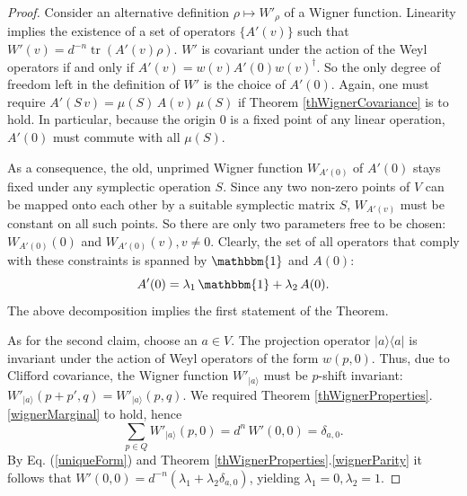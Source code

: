 \documentclass[aps,twocolumn,floatfix]{revtex4}
\def\ket#1.{|#1\rangle}
\def\bra#1.{\langle#1|}
\def\H{\mathcal{H}}
\def\Id{\mathbbm{1}}
\DeclareMathOperator{\tr}{tr}
\begin{document}
\begin{proof}
	Consider an alternative definition $\rho \mapsto W'_\rho$ of a
	Wigner function. Linearity implies the existence of a set of
	operators $\{A'(v)\}$ such that
	$
		W'(v)=d^{-n} \tr(A'(v) \rho)
	$.
	$W'$ is covariant under the action of the Weyl operators if and only
	if $A'(v)=w(v)A'(0)w(v)^\dagger$. So the only degree of freedom left
	in the definition of $W'$ is the choice of $A'(0)$. Again, one must
	require $A'(S\,v)=\mu(S)\,A(v)\,\mu(S)$ if Theorem
	\ref{thWignerCovariance} is to hold. In
	particular, because the origin $0$ is a fixed point of any linear
	operation, $A'(0)$ must commute with all $\mu(S)$.

	As a consequence, the old, unprimed Wigner function $W_{A'(0)}$ of
	$A'(0)$ stays fixed under any symplectic operation $S$.	Since any two
	non-zero points of $V$ can be mapped onto each other by a suitable
	symplectic matrix $S$, $W_{A'(v)}$ must be constant on all such
	points.  So there are only two parameters free to be chosen:
	$W_{A'(0)}(0)$ and $W_{A'(0)}(v), v\neq0$.  Clearly, the set of all
	operators that comply with these constraints is spanned by $\Id$ and
	$A(0)$: 
	\begin{equation}\label{uniqueForm}
		A'(0)=\lambda_1\,\Id+\lambda_2\,A(0).
	\end{equation}
	The above decomposition implies the first statement of the Theorem.

	As for the second claim, choose an $a\in V$. The projection operator
	$\ket a.\bra a.$ is invariant under the action of Weyl operators of
	the form $w(p,0)$. Thus, due to Clifford covariance, the Wigner
	function $W'_{\ket a.}$ must be $p$-shift invariant: $W'_{\ket
	a.}(p+p',q)=W'_{\ket a.}(p,q)$. We required Theorem
	\ref{thWignerProperties}.\ref{wignerMarginal} to hold, hence
	\begin{equation*}
		\sum_{p\in Q} W'_{\ket a.}(p,0) = d^n\,W'(0,0) = \delta_{a,0}.
	\end{equation*}
	By Eq. (\ref{uniqueForm}) and Theorem
	\ref{thWignerProperties}.\ref{wignerParity} it follows that
		$W'(0,0) 
		= d^{-n}(\lambda_1 + \lambda_2 \delta_{a,0})$,
	yielding $\lambda_1=0, \lambda_2=1$.
\end{proof}

\end{document}
